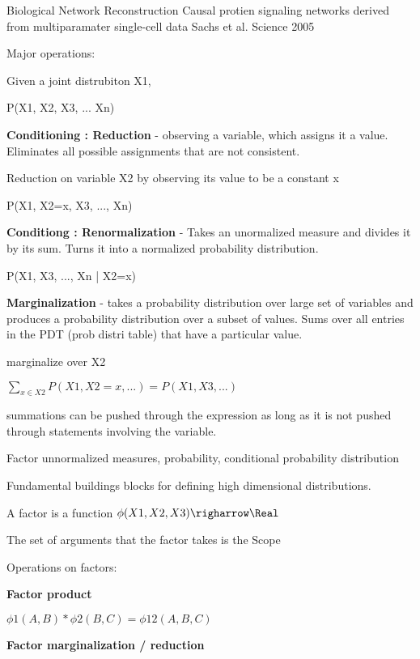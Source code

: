 

Biological Network Reconstruction 
Causal protien signaling networks derived from multiparamater single-cell data
Sachs et al. Science 2005



Major operations: 

Given a joint distrubiton 
X1,

P(X1, X2, X3, ... Xn)

\textbf{Conditioning : Reduction} - observing a variable, which assigns it a value. 
Eliminates all possible assignments that are not consistent. 

Reduction on variable X2 by observing its value to be a constant x

P(X1, X2=x, X3, ..., Xn)

\textbf{Conditiong : Renormalization} - Takes an unormalized measure and divides it by
its sum. Turns it into a normalized probability distribution.

P(X1, X3, ..., Xn | X2=x)


\textbf{Marginalization} - takes a probability distribution over large set of variables
and produces a probability distribution over a subset of values.  Sums over all 
entries in the PDT (prob distri table) that have a particular value.

marginalize over X2

$\sum_{x \in X2} P(X1, X2=x, ...) = P(X1, X3, ...)$


summations can be pushed through the expression as long as it is not pushed through statements involving the variable. 



Factor \ni unnormalized measures, probability, conditional probability distribution

Fundamental buildings blocks for defining high dimensional distributions. 

A factor is a function $\phi(X1, X2, X3) \righarrow \Real$

The set of arguments that the factor takes is the Scope


Operations on factors:

\textbf{Factor product}

$\phi1(A, B) * \phi2(B, C) = \phi12(A, B, C)$

\textbf{Factor marginalization / reduction}


